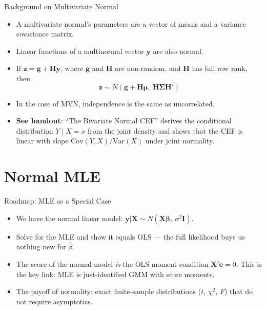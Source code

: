 \documentclass[aspectratio=169, handout, t]{beamer}
\numberwithin{equation}{section}
\begin{document}
\begin{frame}{Background on Multivariate Normal}
\begin{itemize}
\item A multivariate normal's parameters are a vector of means and a variance covariance matrix.
\item  Linear functions of a multinormal vector $\bm{y}$ are also normal.\\
\item If $\bm{z}=\bm{g}+\bm{H}\bm{y}$, where $\bm{g}$ and $\bm{H}$ are non-random, and $\bm{H}$ has full row rank, then 
$$\bm{z}\sim N(\bm{g}+\bm{H\mu},\ \bm{H\Sigma H'})$$
\item In the case of MVN, independence is the same as uncorrelated.
\item \textbf{See handout}: ``The Bivariate Normal CEF'' derives the conditional distribution $Y\mid X=x$ from the joint density and shows that the CEF is linear with slope $\text{Cov}(Y,X)/\text{Var}(X)$ under joint normality.
\end{itemize}
\end{frame}

\section{Normal MLE}

\begin{frame}{Roadmap: MLE as a Special Case}
\begin{itemize}\setlength{\itemsep}{6pt}
\item We have the normal linear model: $\bm{y}|\bm{X}\sim N(\bm{X\beta},\ \sigma^2\bm{I})$.\pause
\item Solve for the MLE and show it equals OLS --- the full likelihood buys us nothing new for $\hat{\beta}$.\pause
\item The \alert{score} of the normal model \emph{is} the OLS moment condition $\bm{X'e}=0$.  This is the key link: MLE is just-identified GMM with score moments.\pause
\item The payoff of normality: exact finite-sample distributions ($t$, $\chi^2$, $F$) that do not require asymptotics.
\end{itemize}
\end{frame}
\end{document}
